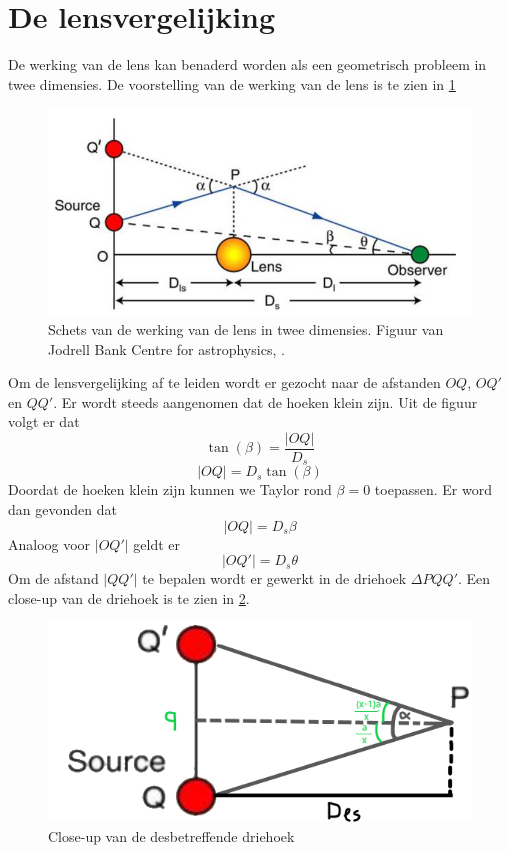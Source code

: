 \section{De lensvergelijking}
\label{appendix:lensvergelijking}
De werking van de lens kan benaderd worden als een geometrisch probleem in twee dimensies. De voorstelling van de werking van de lens is te zien in \cref{fig:lensvgl}
\begin{figure}[H]
    \centering
    \includegraphics[scale=0.5]{Figures/Lensvergelijking.png}
    \caption{Schets van de werking van de lens in twee dimensies. Figuur van Jodrell Bank Centre for astrophysics, \cite{jodrell-bank-centre-for-astrophysics-no-date}.}
    \label{fig:lensvgl}
\end{figure}\mbox{}
Om de lensvergelijking af te leiden wordt er gezocht naar de afstanden $OQ$, $OQ'$ en $QQ'$. Er wordt steeds aangenomen dat de hoeken klein zijn. Uit de figuur volgt er dat
$$\tan(\beta) = \frac{|OQ|}{D_{s}}$$
$$|OQ| = D_{s}\tan(\beta)$$
Doordat de hoeken klein zijn kunnen we Taylor rond $\beta=0$ toepassen. Er word dan gevonden dat
\begin{equation}
  |OQ| = D_{s}\beta  
  \label{for:OQ}
\end{equation}
Analoog voor $|OQ'|$ geldt er
\begin{equation}
   |OQ'| = D_{s}\theta 
   \label{for:OQ'}
\end{equation}
Om de afstand $|QQ'|$ te bepalen wordt er gewerkt in de driehoek $\Delta PQQ'$. Een close-up van de driehoek is te zien in \cref{fig:driehoek}.
\begin{figure}[h]
    \centering
    \includegraphics[scale=0.45]{Figures/driehoek.png}
    \caption{Close-up van de desbetreffende driehoek}
    \label{fig:driehoek}
\end{figure}
